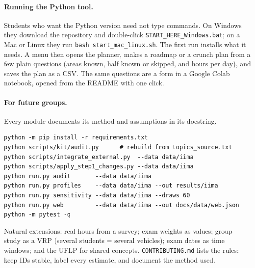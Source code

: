 \documentclass[11pt,a4paper]{article}
\begin{document}
\paragraph{Running the Python tool.} Students who want the Python version need not type commands. On Windows they download the repository and double-click \texttt{START\_HERE\_Windows.bat}; on a Mac or Linux they run \texttt{bash start\_mac\_linux.sh}. The first run installs what it needs. A menu then opens the planner, makes a roadmap or a crunch plan from a few plain questions (areas known, half known or skipped, and hours per day), and saves the plan as a CSV. The same questions are a form in a Google Colab notebook, opened from the README with one click.

\paragraph{For future groups.} Every module documents its method and assumptions in its docstring.
\begin{verbatim}
python -m pip install -r requirements.txt
python scripts/kit/audit.py      # rebuild from topics_source.txt
python scripts/integrate_external.py  --data data/iima
python scripts/apply_step1_changes.py --data data/iima
python run.py audit       --data data/iima
python run.py profiles    --data data/iima --out results/iima
python run.py sensitivity --data data/iima --draws 60
python run.py web         --data data/iima --out docs/data/web.json
python -m pytest -q
\end{verbatim}
Natural extensions: real hours from a survey; exam weights as values; group study as a VRP (several students = several vehicles); exam dates as time windows; and the UFLP for shared concepts. \texttt{CONTRIBUTING.md} lists the rules: keep IDs stable, label every estimate, and document the method used.




\appendix
\end{document}
